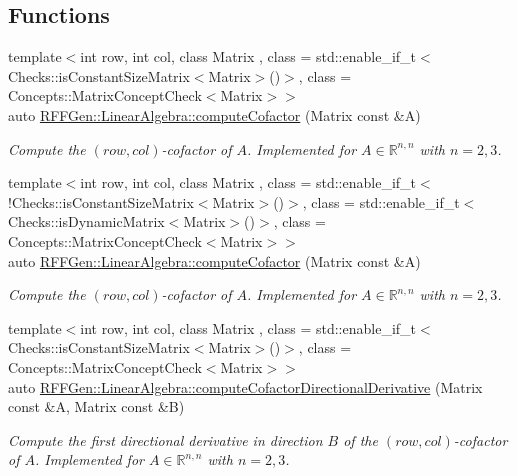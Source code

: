 \subsection*{Functions}
\begin{DoxyCompactItemize}
\item 
{\footnotesize template$<$int row, int col, class Matrix , class  = std\-::enable\-\_\-if\-\_\-t$<$\-Checks\-::is\-Constant\-Size\-Matrix$<$\-Matrix$>$()$>$, class  = Concepts\-::\-Matrix\-Concept\-Check$<$\-Matrix$>$$>$ }\\auto \hyperlink{group__LinearAlgebraGroup_ga6001dbc498c56902aeda2d2e6f93758e}{R\-F\-F\-Gen\-::\-Linear\-Algebra\-::compute\-Cofactor} (Matrix const \&A)
\begin{DoxyCompactList}\small\item\em Compute the $(row,col)$-\/cofactor of $ A $. Implemented for $ A\in \mathbb{R}^{n,n} $ with $ n=2,3 $. \end{DoxyCompactList}\item 
{\footnotesize template$<$int row, int col, class Matrix , class  = std\-::enable\-\_\-if\-\_\-t$<$!\-Checks\-::is\-Constant\-Size\-Matrix$<$\-Matrix$>$()$>$, class  = std\-::enable\-\_\-if\-\_\-t$<$\-Checks\-::is\-Dynamic\-Matrix$<$\-Matrix$>$()$>$, class  = Concepts\-::\-Matrix\-Concept\-Check$<$\-Matrix$>$$>$ }\\auto \hyperlink{group__LinearAlgebraGroup_gaf18f1bcaac9b24ebae5c7020363ef827}{R\-F\-F\-Gen\-::\-Linear\-Algebra\-::compute\-Cofactor} (Matrix const \&A)
\begin{DoxyCompactList}\small\item\em Compute the $(row,col)$-\/cofactor of $ A $. Implemented for $ A\in \mathbb{R}^{n,n} $ with $ n=2,3 $. \end{DoxyCompactList}\item 
{\footnotesize template$<$int row, int col, class Matrix , class  = std\-::enable\-\_\-if\-\_\-t$<$\-Checks\-::is\-Constant\-Size\-Matrix$<$\-Matrix$>$()$>$, class  = Concepts\-::\-Matrix\-Concept\-Check$<$\-Matrix$>$$>$ }\\auto \hyperlink{group__LinearAlgebraGroup_ga5194f473d8619836b838de8029bc3172}{R\-F\-F\-Gen\-::\-Linear\-Algebra\-::compute\-Cofactor\-Directional\-Derivative} (Matrix const \&A, Matrix const \&B)
\begin{DoxyCompactList}\small\item\em Compute the first directional derivative in direction $ B $ of the $(row,col)$-\/cofactor of $ A $. Implemented for $ A\in \mathbb{R}^{n,n} $ with $ n=2,3 $. \end{DoxyCompactList}\item 

\end{DoxyCompactItemize}
